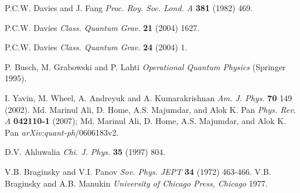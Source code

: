 \documentclass[%
 reprint,
 amsmath,amssymb,
 aps,
]{revtex4-1}
\begin{document}
\begin{thebibliography}{99}
 P.C.W. Davies and J. Fang {\it Proc. Roy. Soc. Lond. A} {\bf 381} (1982) 469.



 P.C.W. Davies {\it Class. Quantum Grav.} {\bf 21} (2004) 1627.

 P.C.W. Davies {\it Class. Quantum Grav.} {\bf 24} (2004) 1.



 P. Busch, M. Grabowski and P. Lahti {\em Operational Quantum Physics} (Springer 1995).



 I. Yavin, M. Wheel, A. Andreyuk and A. Kumarakrishnan {\it Am. J. Phys.} {\bf 70} 149 (2002).
 Md. Marinul Ali, D. Home, A.S. Majumdar, and Alok K. Pan {\it Phys. Rev. A} {\bf 042110-1} (2007); Md. Marinul Ali, D. Home, A.S. Majumdar, and Alok K. Pan {\it arXiv:quant-ph}/0606183v2.

 D.V. Ahluwalia {\it Chi. J. Phys.} {\bf 35} (1997) 804.

 V.B. Braginsky and V.I. Panov {\it Sov. Phys. JEPT} {\bf 34} (1972) 463-466. V.B. Braginsky and A.B. Manukin {\it University of Chicago Press, Chicago} 1977.


\end{thebibliography}
\end{document}
